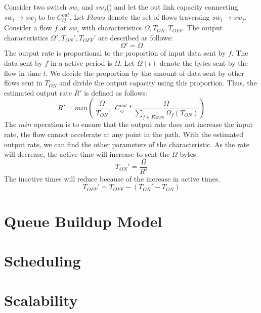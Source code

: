 Consider two switch $sw_i$ and $sw_j$() and let the out link
capacity connecting $sw_i \rightarrow sw_j$ to be $C_{ij}^{out}$. Let $Flows$
denote the set of flows traversing $sw_i \rightarrow sw_j$. Consider a flow $f$ at $sw_i$ 
with characteristics $\Omega, T_{ON}, T_{OFF}$. The output characteristics $\Omega',T_{ON}', T_{OFF}'$  are described as follows: 
\begin{equation}
	\Omega' = \Omega
\end{equation} 
The output rate is proportional to the proportion of input data sent by $f$. The data sent by
$f$ in a active period is $\Omega$. Let $\Omega(t)$ denote the bytes sent by the flow in time $t$.
We decide the proportion by the amount of data sent by other flows sent in $T_{ON}$ and
divide the output capacity using this proportion. Thus, the estimated output rate $R'$ is defined as follows: 
\begin{equation}
	R' = min(\ \frac{\Omega}{T_{ON}}, \ \  C_{ij}^{out} * \frac{\Omega}{\sum_{f \in Flows} \Omega_f(T_{ON}) })
\end{equation}
The $min$ operation is to ensure that the output rate does not increase the input rate,
the flow cannot accelerate at any point in the path. With the estimated output rate, we can find the other parameters of the characteristic. As the rate will decrease, the active time will increase to sent the $\Omega$ bytes.
\begin{equation}
	T_{ON}' = \frac{\Omega}{R'}
\end{equation}
The inactive times will reduce because of the increase in active times. 
\begin{equation}
	T_{OFF}' = T_{OFF} - ( T_{ON}'  - T_{ON} )
\end{equation}

\section{Queue Buildup Model}

\section{Scheduling }

\section{Scalability}